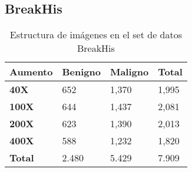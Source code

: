 \subsection{BreakHis}

\begin{table}[!ht]
    \centering
    \begin{tabular}{|l|l|l|l|}
    \hline
        \textbf{Aumento} & \textbf{Benigno} & \textbf{Maligno} & \textbf{Total} \\ \hline
        \textbf{40X} & 652 & 1,370 & 1,995 \\ \hline
        \textbf{100X} & 644 & 1,437 & 2,081 \\ \hline
        \textbf{200X} & 623 & 1,390 & 2,013 \\ \hline
        \textbf{400X} & 588 & 1,232 & 1,820 \\ \hline
        \textbf{Total} & 2.480 & 5.429 & 7.909 \\ \hline
    \end{tabular}
    \caption{Estructura de imágenes en el set de datos BreakHis}
    \label{tab:BreakHis_1}
\end{table}